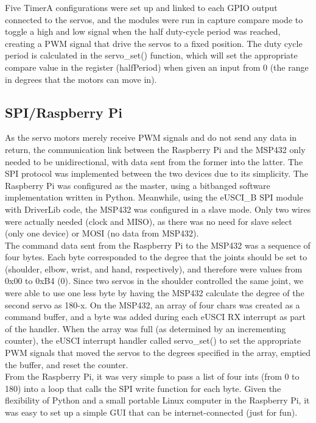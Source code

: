 \documentclass[10pt]{article}
\begin{document}
Five TimerA configurations were set up and linked to each GPIO output connected to the servos, and the modules were run in capture compare mode to toggle a high and low signal when the half duty-cycle period was reached, creating a PWM signal that drive the servos to a fixed position. The duty cycle period is calculated in the servo\_set() function, which will set the appropriate compare value in the register (halfPeriod) when given an input from 0 (the range in degrees that the motors can move in).

\subsection{SPI/Raspberry Pi}

As the servo motors merely receive PWM signals and do not send any data in return, the communication link between the Raspberry Pi and the MSP432 only needed to be unidirectional, with data sent from the former into the latter. 
The SPI protocol was implemented between the two devices due to its simplicity. The Raspberry Pi was configured as the master, using a bitbanged software implementation written in Python. Meanwhile, using the eUSCI\_B SPI module with DriverLib code, the MSP432 was configured in a slave mode. Only two wires were actually needed (clock and MISO), as there was no need for slave select (only one device) or MOSI (no data from MSP432). \\ \newline
The command data sent from the Raspberry Pi to the MSP432 was a sequence of four bytes. Each byte corresponded to the degree that the joints should be set to (shoulder, elbow, wrist, and hand, respectively), and therefore were values from 0x00 to 0xB4 (0). Since two servos in the shoulder controlled the same joint, we were able to use one less byte by having the MSP432 calculate the degree of the second servo as 180\--x. On the MSP432, an array of four chars was created as a command buffer, and a byte was added during each eUSCI RX interrupt as part of the handler. When the array was full (as determined by an incrementing counter), the eUSCI interrupt handler called servo\_set() to set the appropriate PWM signals that moved the servos to the degrees specified in the array, emptied the buffer, and reset the counter. \\ \newline
From the Raspberry Pi, it was very simple to pass a list of four ints (from 0 to 180) into a loop that calls the SPI write function for each byte. Given the flexibility of Python and a small portable Linux computer in the Raspberry Pi, it was easy to set up a simple GUI that can be internet-connected (just for fun).
\end{document}
